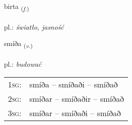 \documentclass[frontgrid, backgrid]{flacards}\usepackage[]{graphicx}\usepackage[]{xcolor}
\begin{document}
\renewcommand{\flhead}{\vskip5pt \fboxsep=0pt {\small\bfseries\footnotesize Nafnorð | Noun}}
\renewcommand{\fcfoot}{\vskip5pt \fboxsep=0pt \hspace{2pt}{\small\bfseries\footnotesize 2K}}

\renewcommand{\blhead}{\vskip5pt {\small\bfseries\footnotesize Nafnorð | Noun }}
\renewcommand{\bcfoot}{\vskip5pt \hspace{2pt}{\small\bfseries\footnotesize 2K}}


{birta \small{\textsubscript{(\textit{f.})}} \\[1ex] %
\textphonetic{[pɪr̥ta]} \\
pl.: \emph{światło, jasność} \\  [2ex]
\renewcommand*{\arraystretch}{0.8}
}

\renewcommand{\flhead}{\vskip5pt \fboxsep=0pt {\small\bfseries\footnotesize Sagnorð | Verb}}
\renewcommand{\fcfoot}{\vskip5pt \fboxsep=0pt \hspace{2pt}{\small\bfseries\footnotesize 2K}}

\renewcommand{\blhead}{\vskip5pt {\small\bfseries\footnotesize Sagnorð | Verb }}
\renewcommand{\bcfoot}{\vskip5pt \hspace{2pt}{\small\bfseries\footnotesize 2K}}


{smíða \small{\textsubscript{(\textit{v.})}} \\[1ex] %
\textphonetic{[smiːða]} \\
pl.: \emph{budować} \\  [2ex]
\renewcommand*{\arraystretch}{0.8}
\begin{tabular}{p{1cm}l}
\textsc{1sg}: & smíða -- smíðaði -- smíðað \\ 
\textsc{2sg}: & smíðar -- smíðaðir -- smíðað \\ 
\textsc{3sg}: & smíðar -- smíðaði -- smíðað \\ 
\end{tabular}
}
\end{document}
